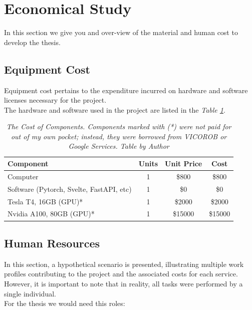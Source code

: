 \section{Economical Study}

In this section we give you and over-view of the material and human cost to develop the thesis.

\subsection{Equipment Cost}

Equipment cost pertains to the expenditure incurred on hardware and software licenses necessary for the project. \\

The hardware and software used in the project are listed in the \textit{Table \ref{table:equipment_cost}}.

\begin{table}[H]
\centering
\begin{tabular}{lccc}
	 \toprule
    \textbf{Component} & \textbf{Units} & \textbf{Unit Price} & \textbf{Cost} \\
		\midrule
    Computer & 1 & \$800 & \$800 \\
    Software (Pytorch, Svelte, FastAPI, etc) & 1 & \$0 & \$0 \\
    Tesla T4, 16GB (GPU)* & 1 & \$2000 & \$2000 \\
    Nvidia A100, 80GB (GPU)* & 1 & \$15000 & \$15000 \\
		\bottomrule
\end{tabular}
\caption[The Cost of Components.]
  {\textit{The Cost of Components.
  Components marked with (*) were not paid for out of my own pocket; instead, they were borrowed from VICOROB or
  Google Services. Table by Author}}
{\label{table:equipment_cost}}
\end{table}

\subsection{Human Resources}

In this section, a hypothetical scenario is presented, illustrating multiple work profiles contributing to the project and the associated costs for each service.
However, it is important to note that in reality, all tasks were performed by a single individual. \\

For the thesis we would need this roles: \\

